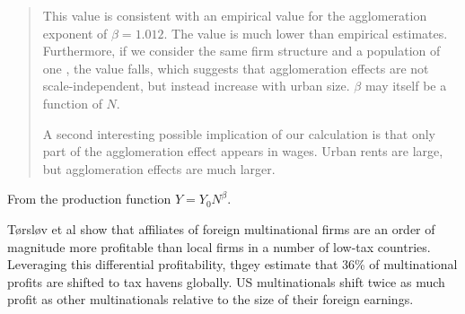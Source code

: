 \begin{enumerate}
\begin{quotation}
This value is consistent with an empirical  value for  the agglomeration exponent of $\beta =  1.012$. The value is much lower than empirical estimates. Furthermore, if we consider the same firm structure and a population of one , the value falls, which suggests that agglomeration effects are not scale-independent, but instead increase with urban size. $\beta$ may itself be a function of $N$.

A second interesting possible implication of our calculation is that only part of the agglomeration effect appears in wages. Urban rents  are large, but agglomeration effects are much larger.

\hspace{-1cm}
    \end{quotation}

    

  

    
    

    \end{enumerate}



From the production function  $Y=Y_0N^\beta$.

Tørsløv et al \cite{torslovMissingProfitsNations2023} show that affiliates of foreign multinational firms are an order of magnitude more profitable than local firms in a number of low-tax countries. Leveraging this differential profitability, thgey estimate that 36\% of multinational profits are shifted to tax havens globally. US multinationals shift twice as much profit as other multinationals relative to the size of their foreign earnings.


